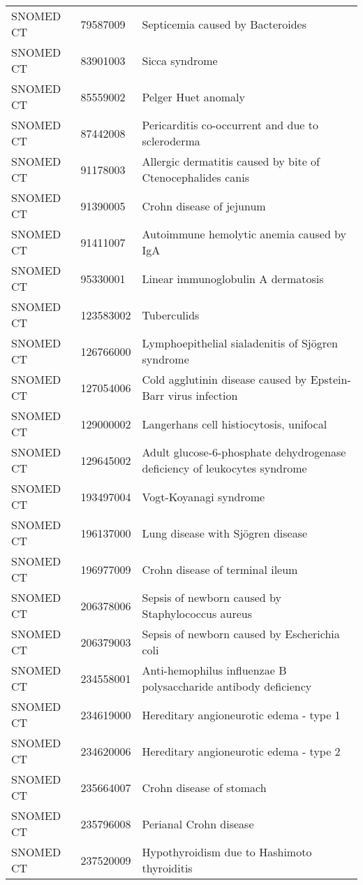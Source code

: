 \begin{longtable}{p{}p{}p{}}
  SNOMED CT & 79587009 & Septicemia caused by Bacteroides \\ 
  SNOMED CT & 83901003 & Sicca syndrome \\ 
  SNOMED CT & 85559002 & Pelger Huet anomaly \\ 
  SNOMED CT & 87442008 & Pericarditis co-occurrent and due to scleroderma \\ 
  SNOMED CT & 91178003 & Allergic dermatitis caused by bite of Ctenocephalides canis \\ 
  SNOMED CT & 91390005 & Crohn disease of jejunum \\ 
  SNOMED CT & 91411007 & Autoimmune hemolytic anemia caused by IgA \\ 
  SNOMED CT & 95330001 & Linear immunoglobulin A dermatosis \\ 
  SNOMED CT & 123583002 & Tuberculids \\ 
  SNOMED CT & 126766000 & Lymphoepithelial sialadenitis of Sjögren syndrome \\ 
  SNOMED CT & 127054006 & Cold agglutinin disease caused by Epstein-Barr virus infection \\ 
  SNOMED CT & 129000002 & Langerhans cell histiocytosis, unifocal \\ 
  SNOMED CT & 129645002 & Adult glucose-6-phosphate dehydrogenase deficiency of leukocytes syndrome \\ 
  SNOMED CT & 193497004 & Vogt-Koyanagi syndrome \\ 
  SNOMED CT & 196137000 & Lung disease with Sjögren disease \\ 
  SNOMED CT & 196977009 & Crohn disease of terminal ileum \\ 
  SNOMED CT & 206378006 & Sepsis of newborn caused by Staphylococcus aureus \\ 
  SNOMED CT & 206379003 & Sepsis of newborn caused by Escherichia coli \\ 
  SNOMED CT & 234558001 & Anti-hemophilus influenzae B polysaccharide antibody deficiency \\ 
  SNOMED CT & 234619000 & Hereditary angioneurotic edema - type 1 \\ 
  SNOMED CT & 234620006 & Hereditary angioneurotic edema - type 2 \\ 
  SNOMED CT & 235664007 & Crohn disease of stomach \\ 
  SNOMED CT & 235796008 & Perianal Crohn disease \\ 
  SNOMED CT & 237520009 & Hypothyroidism due to Hashimoto thyroiditis \\ 

\end{longtable}

